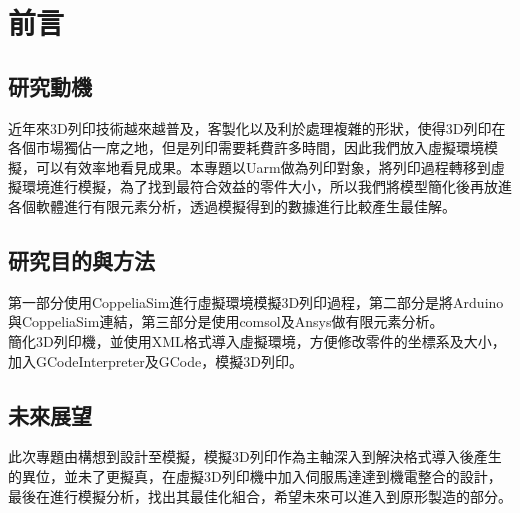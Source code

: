 \chapter{前言}
\renewcommand{\baselinestretch}{10.0} %
\setcounter{page}{1}  %
\fontsize{14pt}{2.5pt}\sectionef
\section{研究動機}
近年來3D列印技術越來越普及，客製化以及利於處理複雜的形狀，使得3D列印在各個市場獨佔一席之地，但是列印需要耗費許多時間，因此我們放入虛擬環境模擬，可以有效率地看見成果。本專題以Uarm做為列印對象，將列印過程轉移到虛擬環境進行模擬，為了找到最符合效益的零件大小，所以我們將模型簡化後再放進各個軟體進行有限元素分析，透過模擬得到的數據進行比較產生最佳解。\\

\section{研究目的與方法}
第一部分使用CoppeliaSim進行虛擬環境模擬3D列印過程，第二部分是將Arduino與CoppeliaSim連結，第三部分是使用comsol及Ansys做有限元素分析。\\

簡化3D列印機，並使用XML格式導入虛擬環境，方便修改零件的坐標系及大小，加入GCodeInterpreter及GCode，模擬3D列印。\\

\section{未來展望}

此次專題由構想到設計至模擬，模擬3D列印作為主軸深入到解決格式導入後產生的異位，並未了更擬真，在虛擬3D列印機中加入伺服馬達達到機電整合的設計，最後在進行模擬分析，找出其最佳化組合，希望未來可以進入到原形製造的部分。\\


\renewcommand{\baselinestretch}{0.5} %